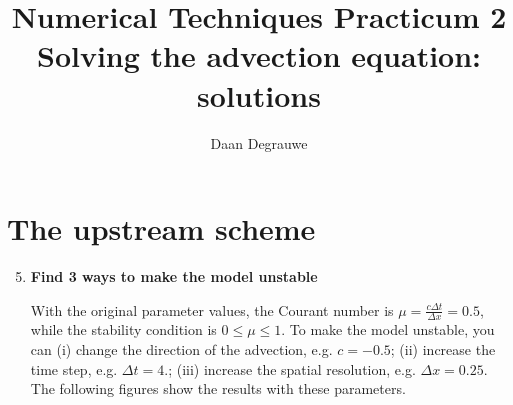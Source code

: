 \documentclass[a4paper,fleqn]{article}
\title{%
	\bfseries%
	{\large Numerical Techniques Practicum 2}\\[3ex]
	{\Large Solving the advection equation: solutions}
}
\author{Daan Degrauwe}
\begin{document}
%
\maketitle
%
\setcounter{section}{1}
%
\section{The upstream scheme}
%
\begin{enumerate}
	\setcounter{enumi}{4}
	\item \textbf{Find 3 ways to make the model unstable}
		\par
		With the original parameter values, the Courant number is $\mu=\frac{c\Delta t}{\Delta x}=0.5$, while the stability condition is $0\leq\mu\leq 1$. To make the model unstable, you can (i) change the direction of the advection, e.g. $c=-0.5$; (ii) increase the time step, e.g. $\Delta t=4.$; (iii) increase the spatial resolution, e.g. $\Delta x=0.25$. The following figures show the results with these parameters.
		\begin{center}
			\hspace*{-50mm}
			\begin{tabular}{ccc}

\end{tabular}
\end{center}
\end{enumerate}
\end{document}
